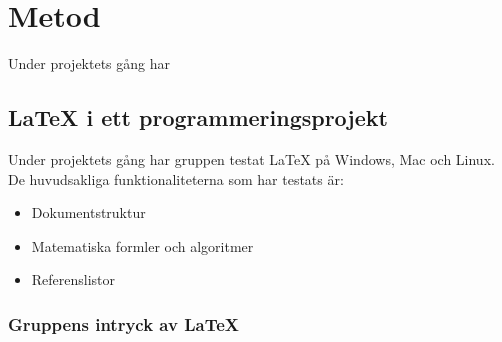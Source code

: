 \section{Metod}
Under projektets gång har  

\subsection{{\LaTeX} i ett programmeringsprojekt}
Under projektets gång har gruppen testat {\LaTeX} på Windows, Mac och Linux. De huvudsakliga funktionaliteterna som har testats är: 
\begin{itemize}
\item Dokumentstruktur
\item Matematiska formler och algoritmer
\item Referenslistor
\end{itemize}  
  

\subsubsection{Gruppens intryck av {\LaTeX}}

